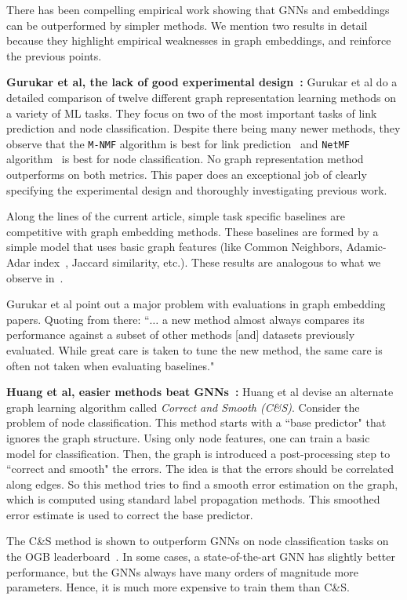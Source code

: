 \documentclass[11pt]{article}
\begin{document}
There has been compelling empirical work showing that GNNs and embeddings can be 
outperformed by simpler methods. We mention two results in detail because
they highlight empirical weaknesses in graph embeddings, and reinforce the
previous points.

{\bf Gurukar et al, the lack of good experimental design~\cite{GuVi+19}:} Gurukar et al do a detailed comparison of twelve
different graph representation learning methods on a variety of ML tasks. They focus on two
of the most important tasks of link prediction and node classification. Despite
there being many newer methods, they observe that the {\tt M-NMF} algorithm
is best for link prediction~\cite{WaCu+17} and {\tt NetMF} algorithm~\cite{QiDo18} is best for node classification.
No graph representation method outperforms on both metrics. This paper does an exceptional
job of clearly specifying the experimental design and thoroughly investigating previous work.

Along the lines of the current article, simple task specific baselines are competitive with
graph embedding methods. These baselines are formed by a simple model that uses basic graph features
(like Common Neighbors, Adamic-Adar index~\cite{AdAd03}, Jaccard similarity, etc.). These results
are analogous to what we observe in~\cite{StLe+22}. 

Gurukar et al point out a major problem with evaluations in graph embedding papers.
Quoting from there: ``$\ldots$ a new method
almost always compares its performance against a subset of
other methods [and] datasets previously evaluated. While great care is taken
to tune the new method, the same care is often not taken when evaluating baselines."

{\bf Huang et al, easier methods beat GNNs~\cite{HuHe+21}:} Huang et al devise
an alternate graph learning algorithm called \emph{Correct and Smooth (C\&S)}.
Consider the problem of node classification. This method starts with a ``base predictor"
that ignores the graph structure. Using only node features, one can train
a basic model for classification. Then, the graph is introduced a post-processing
step to ``correct and smooth" the errors. The idea is that the errors should be correlated along edges.
So this method tries to find a smooth error estimation on the graph, which 
is computed using standard label propagation methods. This smoothed error estimate is
used to correct the base predictor.

The C\&S method is shown to outperform GNNs on node classification tasks on
the OGB leaderboard~\cite{ogb}. In some cases, a state-of-the-art GNN has slightly
better performance, but the GNNs always have many orders of magnitude more parameters.
Hence, it is much more expensive to train them than C\&S.
\end{document}
